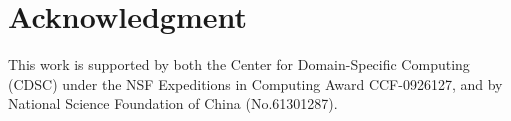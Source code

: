 \documentclass[10pt, conference, compsocconf]{IEEEtran}
\begin{document}
\section*{Acknowledgment}
This work is supported by both the Center for Domain-Specific Computing (CDSC) under the NSF Expeditions in Computing Award CCF-0926127, 
and by National Science Foundation of China (No.61301287).
%
%
%
\newcommand{\BIBdecl}{\setlength{\itemsep}{0.0 em}}

\scriptsize{ 

}
\end{document}
